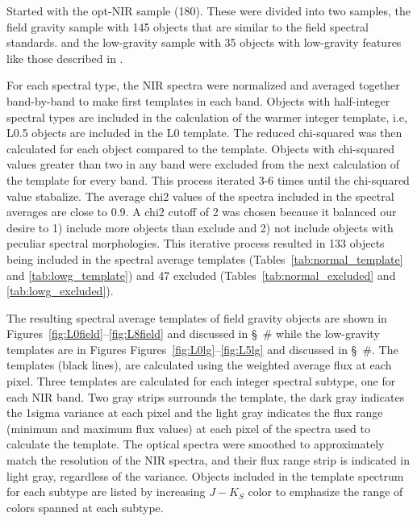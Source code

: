 \documentclass[12pt,preprint]{aastex}
\begin{document}
Started with the opt-NIR sample (180). These were divided into two samples, the field gravity sample with 145 objects that are similar to the \citet{K99} field spectral standards.
 and the low-gravity sample with 35 objects with low-gravity features like those described in \citet{Cruz09_lowg}.

For each spectral type, the NIR spectra were normalized and averaged together band-by-band to make first templates in each band. Objects with half-integer spectral types are included in the calculation of the warmer integer template, i.e, L0.5 objects are included in the L0 template. 
The reduced chi-squared was then calculated for each object compared to the template.
Objects with chi-squared values greater than two in any band were excluded from the next calculation of the template for every band.
This process iterated 3-6 times until the chi-squared value stabalize. The average chi2 values of the spectra included in the spectral averages are close to 0.9. A chi2 cutoff of 2 was chosen because it balanced our desire to 1) include more objects than exclude and 2) not include objects with peculiar spectral morphologies. 
This iterative process resulted in 133 objects being included  in the spectral average templates (Tables~\ref{tab:normal_template} and \ref{tab:lowg_template}) and 47 excluded (Tables~\ref{tab:normal_excluded} and \ref{tab:lowg_excluded}).



The resulting spectral average templates of field gravity objects are shown in Figures~\ref{fig:L0field}--\ref{fig:L8field} and discussed in \S~\# while the low-gravity templates are in Figures Figures~\ref{fig:L0lg}--\ref{fig:L5lg} and discussed in \S~\#. The templates (black lines), are calculated using the weighted average flux at each pixel. 
Three templates are calculated for each integer spectral subtype, one for each NIR band. 
Two gray strips surrounds the template, the dark gray indicates the 1sigma variance at each pixel and the light gray indicates the flux range (minimum and maximum flux values) at each pixel of the spectra used to calculate the template. 
The optical spectra were smoothed to approximately match the resolution of the NIR spectra, and their flux range strip is indicated in light gray, regardless of the variance.
Objects included in the template spectrum for each subtype are listed by increasing $J-K_S$ color to emphasize the range of colors spanned at each subtype.
\end{document}
